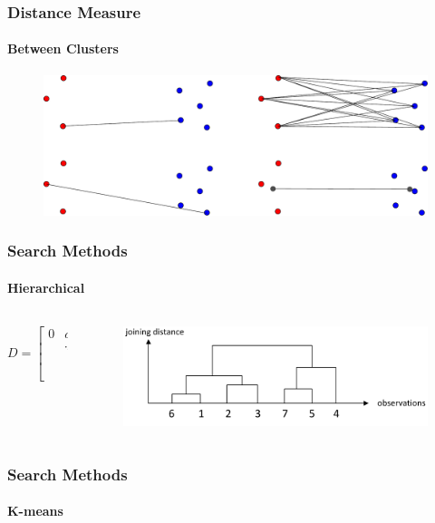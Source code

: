 \documentclass[aspectratio=169,10pt,t]{beamer}
\begin{document}
\begin{frame}[t]
	\frametitle{Distance Measure}
	\framesubtitle{Between Clusters}

	\begin{figure}[h]
		\centering
		\includegraphics[width=\textwidth]{images/linkage.pdf}
	\end{figure}
\end{frame}


\begin{frame}[t]
	\frametitle{Search Methods}
	\framesubtitle{Hierarchical}

	\begin{columns}
		\begin{column}{0.5\textwidth}
			\[
				D = \begin{bmatrix}
					0 & d_{12} & \cdots & d_{1n}\\
						& \ddots & & \\
						&& \ddots& \\
						&&&0
				\end{bmatrix}
			.\] 
		\end{column}
		\begin{column}{0.5\textwidth}

			\begin{figure}[h]
				\centering
				\includegraphics[width=1\textwidth]{images/hirakisk-2.png}
			\end{figure}
		\end{column}
	\end{columns}
\end{frame}

\begin{frame}[t]
	\frametitle{Search Methods}
	\framesubtitle{K-means}

	\begin{figure}[h]
		\centering
	\end{figure}

\end{frame}
\end{document}
